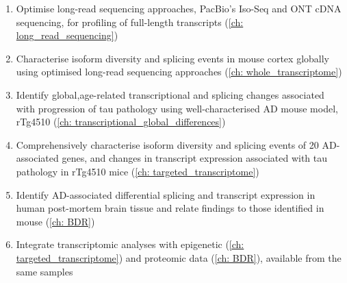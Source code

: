 \begin{enumerate}[]
	\item Optimise long-read sequencing approaches, PacBio's Iso-Seq and ONT cDNA sequencing, for profiling of full-length transcripts (\cref{ch: long_read_sequencing}) 
	\item Characterise isoform diversity and splicing events in mouse cortex globally using optimised long-read sequencing approaches (\cref{ch: whole_transcriptome}) 
	\item Identify global,age-related transcriptional and splicing changes associated with progression of tau pathology using well-characterised AD mouse model, rTg4510 (\cref{ch: transcriptional_global_differences})
	\item Comprehensively characterise isoform diversity and splicing events of 20 AD-associated genes, and changes in transcript expression associated with tau pathology in rTg4510 mice (\cref{ch: targeted_transcriptome})
	\item Identify AD-associated differential splicing and transcript expression in human post-mortem brain tissue and relate findings to those identified in mouse (\cref{ch: BDR})
	\item Integrate transcriptomic analyses with epigenetic (\cref{ch: targeted_transcriptome}) and proteomic data (\cref{ch: BDR}), available from the same samples
\end{enumerate}


